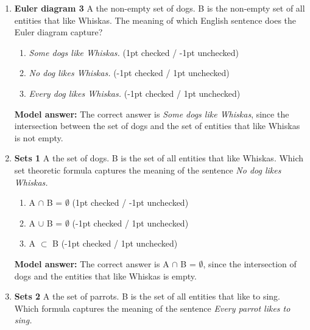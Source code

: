 \documentclass[a4,11pt]{article}
\begin{document}
\begin{enumerate}[leftmargin = 12pt]
{\bf Model answer:}  The correct answer is \textit{No dog likes Whiskas}, since the intersection between the set of dogs and the set of entities that like Whiskas is empty.

\item {\bf Euler diagram 3} A  the non-empty set of dogs. B is the non-empty set of all entities that like Whiskas. The meaning of which English sentence does the Euler diagram capture?


      \begin{enumerate}[noitemsep]
        \item \textit{Some dogs like Whiskas.} (1pt checked / -1pt unchecked)
	\item \textit{No dog likes Whiskas.} (-1pt checked / 1pt unchecked)
        \item \textit{Every dog likes Whiskas.} (-1pt checked / 1pt unchecked)
	\end{enumerate}	

{\bf Model answer:}  The correct answer is \textit{Some dogs like Whiskas}, since the intersection between the set of dogs and the set of entities that like Whiskas is not empty.


\item {\bf Sets 1} A  the set of dogs. B is the set of all entities that like Whiskas. Which set theoretic formula captures the meaning of the sentence \textit{No dog likes Whiskas.}

      \begin{enumerate}[noitemsep]
        \item A $\cap$ B = $\emptyset$ (1pt checked / -1pt unchecked)
	\item A $\cup$ B = $\emptyset$ (-1pt checked / 1pt unchecked)
        \item A $\subset$ B (-1pt checked / 1pt unchecked)
	\end{enumerate}	
	
{\bf Model answer:}  The correct answer is  A $\cap$ B = $\emptyset$, since the intersection of dogs and the entities that like Whiskas is empty. 


\item {\bf Sets 2} A  the set of parrots. B is the set of all entities that like to sing. Which formula captures the meaning of the sentence \textit{Every parrot likes to sing.}


\end{enumerate}
\end{document}
